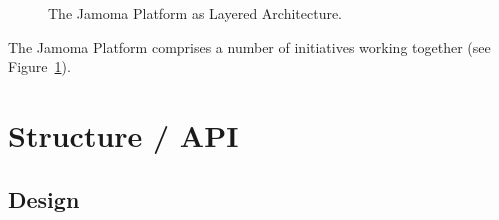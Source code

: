 \documentclass[twoside,10pt]{article}
\newenvironment{packed_item}{
\begin{itemize}
  \setlength{\itemsep}{1pt}
  \setlength{\parskip}{0pt}
  \setlength{\parsep}{0pt}
}{\end{itemize}}
\begin{document}
\begin{figure}[htbp]
\centerline{}
\caption{The Jamoma Platform as Layered Architecture.}
\label{fig:layers}
\end{figure}

The Jamoma Platform comprises a number of initiatives working together
(see Figure~\ref{fig:layers}).





\section{Structure / API} %

\subsection{Design}

\end{document}
